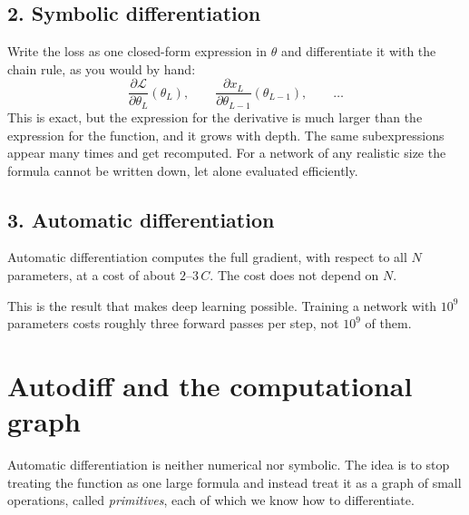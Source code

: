 \documentclass[11pt]{article}
\newcommand{\Loss}{\mathcal{L}}
\begin{document}
\subsection*{2. Symbolic differentiation}

Write the loss as one closed-form expression in $\theta$ and differentiate it with the
chain rule, as you would by hand:
%
\[
  \frac{\partial \Loss}{\partial \theta_L}(\theta_L),
  \qquad
  \frac{\partial x_L}{\partial \theta_{L-1}}(\theta_{L-1}),
  \qquad \ldots
\]
%
This is exact, but the expression for the derivative is much larger than the expression
for the function, and it grows with depth. The same subexpressions appear many times and
get recomputed. For a network of any realistic size the formula cannot be written down,
let alone evaluated efficiently.

\subsection*{3. Automatic differentiation}

\begin{keybox}
Automatic differentiation computes the full gradient, with respect to all $N$ parameters,
at a cost of about $2$--$3\,C$. The cost does not depend on $N$.
\end{keybox}

\noindent
This is the result that makes deep learning possible. Training a network with $10^{9}$
parameters costs roughly three forward passes per step, not $10^{9}$ of them.

\section{Autodiff and the computational graph}

Automatic differentiation is neither numerical nor symbolic. The idea is to stop treating
the function as one large formula and instead treat it as a graph of small operations,
called \emph{primitives}, each of which we know how to differentiate.

\begin{center}
\end{center}
\end{document}
